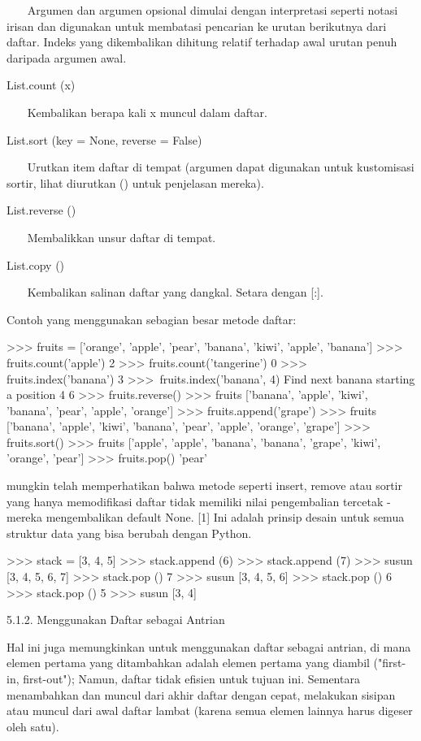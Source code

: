 ~~~ Argumen dan argumen opsional dimulai dengan interpretasi seperti notasi irisan dan digunakan untuk membatasi pencarian ke urutan berikutnya dari daftar. Indeks yang dikembalikan dihitung relatif terhadap awal urutan penuh daripada argumen awal. 

List.count (x) 

~~~ Kembalikan berapa kali x muncul dalam daftar. 

List.sort (key = None, reverse = False) 

~~~ Urutkan item daftar di tempat (argumen dapat digunakan untuk kustomisasi sortir, lihat diurutkan () untuk penjelasan mereka). 

List.reverse () 

~~~ Membalikkan unsur daftar di tempat. 

List.copy () 

~~~ Kembalikan salinan daftar yang dangkal. Setara dengan [:]. 

Contoh yang menggunakan sebagian besar metode daftar: 

>>> fruits = ['orange', 'apple', 'pear', 'banana', 'kiwi', 'apple', 'banana'] 
>>> fruits.count('apple') 
2 
>>> fruits.count('tangerine') 
0 
>>> fruits.index('banana') 
3 
>>>~fruits.index('banana', 4)        Find next banana starting a position 4 
6 
>>> fruits.reverse() 
>>> fruits 
['banana', 'apple', 'kiwi', 'banana', 'pear', 'apple', 'orange'] 
>>> fruits.append('grape') 
>>> fruits 
['banana', 'apple', 'kiwi', 'banana', 'pear', 'apple', 'orange', 'grape'] 
>>> fruits.sort() 
>>> fruits 
['apple', 'apple', 'banana', 'banana', 'grape', 'kiwi', 'orange', 'pear'] 
>>> fruits.pop() 
'pear' 

mungkin telah memperhatikan bahwa metode seperti insert, remove atau sortir yang hanya memodifikasi daftar tidak memiliki nilai pengembalian tercetak - mereka mengembalikan default None. [1] Ini adalah prinsip desain untuk semua struktur data yang bisa berubah dengan Python. 

>>> stack = [3, 4, 5] 
>>> stack.append (6) 
>>> stack.append (7) 
>>> susun 
[3, 4, 5, 6, 7] 
>>> stack.pop () 
7 
>>> susun 
[3, 4, 5, 6] 
>>> stack.pop () 
6 
>>> stack.pop () 
5 
>>> susun 
[3, 4] 

5.1.2. Menggunakan Daftar sebagai Antrian 

Hal ini juga memungkinkan untuk menggunakan daftar sebagai antrian, di mana elemen pertama yang ditambahkan adalah elemen pertama yang diambil ("first-in, first-out"); Namun, daftar tidak efisien untuk tujuan ini. Sementara menambahkan dan muncul dari akhir daftar dengan cepat, melakukan sisipan atau muncul dari awal daftar lambat (karena semua elemen lainnya harus digeser oleh satu). 

